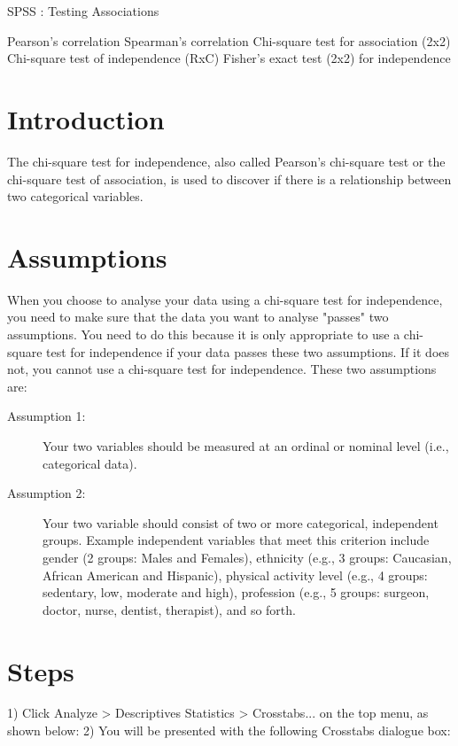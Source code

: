 
SPSS : Testing Associations

Pearson's correlation
Spearman's correlation
Chi-square test for association (2x2)
Chi-square test of independence (RxC)
Fisher's exact test (2x2) for independence 


\section{Introduction}
The chi-square test for independence, also called Pearson's chi-square test or the chi-square test of association, is used to discover if there is a relationship between two categorical variables.

\section{Assumptions}
When you choose to analyse your data using a chi-square test for independence, you need to make sure that the data you want to analyse "passes" two assumptions. You need to do this because it is only appropriate to use a chi-square test for independence if your data passes these two assumptions. If it does not, you cannot use a chi-square test for independence. These two assumptions are:

\begin{description}
\item[Assumption 1:] Your two variables should be measured at an ordinal or nominal level (i.e., categorical data). 

\item[Assumption 2:] Your two variable should consist of two or more categorical, independent groups. Example independent variables that meet this criterion include gender (2 groups: Males and Females), ethnicity (e.g., 3 groups: Caucasian, African American and Hispanic), physical activity level (e.g., 4 groups: sedentary, low, moderate and high), profession (e.g., 5 groups: surgeon, doctor, nurse, dentist, therapist), and so forth.
\end{description}

\section{Steps}
1) Click Analyze > Descriptives Statistics > Crosstabs... on the top menu, as shown below:
2) You will be presented with the following Crosstabs dialogue box:

